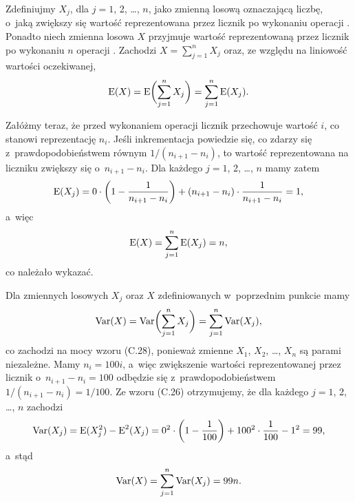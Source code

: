 
\subproblem %
Zdefiniujmy $X_j$, dla $j=1$, 2, \dots, $n$, jako zmienną losową oznaczającą liczbę, o~jaką zwiększy się wartość reprezentowana przez licznik po  wykonaniu operacji .
Ponadto niech zmienna losowa $X$ przyjmuje wartość reprezentowaną przez licznik po wykonaniu $n$ operacji .
Zachodzi $X=\sum_{j=1}^nX_j$ oraz, ze względu na liniowość wartości oczekiwanej,
\[
	\operatorname{E}(X) = \operatorname{E}\biggl(\sum_{j=1}^nX_j\biggr) = \sum_{j=1}^n\operatorname{E}(X_j).
\]

Załóżmy teraz, że przed wykonaniem  operacji  licznik przechowuje wartość $i$, co stanowi reprezentację $n_i$.
Jeśli inkrementacja powiedzie się, co zdarzy się z~prawdopodobieństwem równym $1/(n_{i+1}-n_i)$, to wartość reprezentowana na liczniku zwiększy się o~$n_{i+1}-n_i$.
Dla każdego $j=1$, 2, \dots, $n$ mamy zatem
\[
	\operatorname{E}(X_j) = 0\cdot\biggl(1-\frac{1}{n_{i+1}-n_i}\biggr)+(n_{i+1}-n_i)\cdot\frac{1}{n_{i+1}-n_i} = 1,
\]
a~więc
\[
	\operatorname{E}(X) = \sum_{j=1}^n\operatorname{E}(X_j) = n,
\]
co należało wykazać.

\subproblem %
Dla zmiennych losowych $X_j$ oraz $X$ zdefiniowanych w~poprzednim punkcie mamy
\[
	\operatorname{Var}(X) = \operatorname{Var}\biggl(\sum_{j=1}^nX_j\biggr) = \sum_{j=1}^n\operatorname{Var}(X_j),
\]
co zachodzi na mocy wzoru (C.28), ponieważ zmienne $X_1$, $X_2$, \dots, $X_n$ są parami niezależne.
Mamy $n_i=100i$, a~więc zwiększenie wartości reprezentowanej przez licznik o~$n_{i+1}-n_i=100$ odbędzie się z~prawdopodobieństwem $1/(n_{i+1}-n_i)=1/100$.
Ze wzoru (C.26) otrzymujemy, że dla każdego $j=1$, 2, \dots, $n$ zachodzi
\[
	\operatorname{Var}(X_j) = \operatorname{E}(X_j^2)-\operatorname{E}^2(X_j) = 0^2\cdot\biggl(1-\frac{1}{100}\biggr)+100^2\cdot\frac{1}{100}-1^2 = 99,
\]
a~stąd
\[
	\operatorname{Var}(X) = \sum_{j=1}^n\operatorname{Var}(X_j) = 99n.
\]
